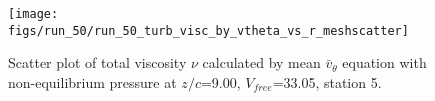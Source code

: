 \begin{figure}[H]
\centering
\texttt{[image: figs/run\_50/run\_50\_turb\_visc\_by\_vtheta\_vs\_r\_meshscatter]}
\caption{Scatter plot of total viscosity $\nu$ calculated by mean $\bar{v}_{\theta}$ equation with non-equilibrium pressure at $z/c$=9.00, $V_{free}$=33.05, station 5.}
\label{fig:run_50_turb_visc_by_vtheta_vs_r_meshscatter}
\end{figure}


